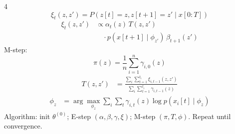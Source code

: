 \documentclass[12pt]{article}
\begin{document}
\begin{multicols*}{4}
\useshortskip \begin{equation*}
    \xi_t(z,z')=P(z[t]=z,z[t+1]=z'\mid x[0:T])
\end{equation*}
\useshortskip \begin{equation*}
    \begin{split}
        \xi_t(z,z')&\propto
        \alpha_t(z)\,T(z,z')\\
        &\quad\cdot p(x[t+1]\mid\phi_{z'})\,\beta_{t+1}(z')
    \end{split}
\end{equation*}
M-step:
\useshortskip \begin{equation*}
    \pi(z)=\frac{1}{n}\sum_{i=1}^{n}\gamma_{i,0}(z)
\end{equation*}
\useshortskip \begin{equation*}
    \begin{split}
        T(z,z')
        &=\frac{\sum_i\sum_{t=1}^{t_i}\xi_{i,t-1}(z,z')}
        {\sum_i\sum_{t=1}^{t_i}\gamma_{i,t-1}(z)}
    \end{split}
\end{equation*}
\useshortskip \begin{equation*}
    \begin{split}
        \phi_z
        &=\arg\max_{\phi_z}\sum_i\sum_t
        \gamma_{i,t}(z)\log p(x_i[t]\mid\phi_z)
    \end{split}
\end{equation*}
Algorithm: init $\theta^{(0)}$; E-step $(\alpha,\beta,\gamma,\xi)$; M-step $(\pi,T,\phi)$.
Repeat until convergence.


\end{multicols*}
\end{document}
